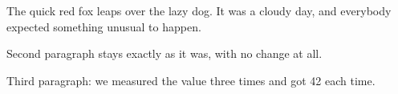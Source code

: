 \documentclass{article}
\begin{document}
The quick red fox leaps over the lazy dog. It was a cloudy day,
and everybody expected something unusual to happen.

Second paragraph stays exactly as it was, with no change at all.

Third paragraph: we measured the value three times and got 42 each time.
\end{document}
